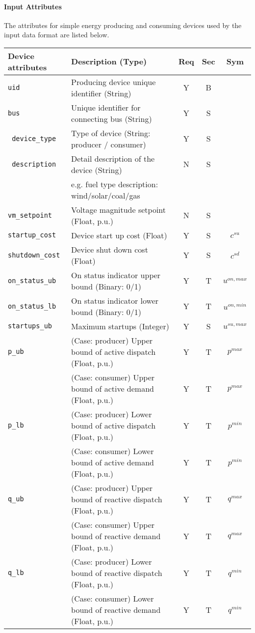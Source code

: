 \documentclass{article}
\begin{document}
\paragraph{Input Attributes} The attributes for 
simple energy producing and consuming devices used by the input data format are listed below.

\begin{center}
\small
\begin{tabular}{ l | l | c | c | c |}
Device attributes & Description (Type) & Req & Sec & Sym\\
\hline
  {\tt uid} & Producing device unique identifier (String) & Y & B &  \\
  {\tt bus} & Unique identifier for connecting bus (String)& Y & S & \\
  {\tt\color{red} device\_type} & Type of device (String: producer / consumer) & Y & S & \\
  {\tt\color{red} description} & Detail description of the device  (String) & N & S & \\
      &e.g. fuel type description: wind/solar/coal/gas  &  &  & \\
  {\tt vm\_setpoint} & Voltage magnitude setpoint (Float, p.u.) & N & S & \\
  {\tt startup\_cost} & Device start up cost (Float) & Y & S & $c^{su}$\\
  {\tt shutdown\_cost} & Device shut down cost (Float) & Y & S & $c^{sd}$\\  
  {\tt on\_status\_ub} & On status indicator upper bound (Binary: 0/1) & Y & T & $u^{on,max}$\\
  {\tt on\_status\_lb} & On status indicator lower bound (Binary: 0/1) & Y & T & $u^{on,min}$\\

  {\tt startups\_ub} & Maximum startups (Integer) & Y & S & $u^{su,max}$\\  
  {\tt p\_ub} & { (Case: producer) Upper bound of active dispatch (Float, p.u.)   }& Y & T & $p^{max}$ \\
              & { (Case: consumer) Upper bound of active demand   (Float, p.u.)   }& Y & T & $p^{max}$ \\
  {\tt p\_lb} & { (Case: producer) Lower bound of active dispatch (Float, p.u.)   }& Y & T & $p^{min}$ \\
              & { (Case: consumer) Lower bound of active demand   (Float, p.u.)   }& Y & T & $p^{min}$ \\
  {\tt q\_ub} & { (Case: producer) Upper bound of reactive dispatch (Float, p.u.) }& Y & T & $q^{max}$\\
              & { (Case: consumer) Upper bound of reactive demand   (Float, p.u.) }& Y & T & $q^{max}$\\
  {\tt q\_lb} & { (Case: producer) Lower bound of reactive dispatch (Float, p.u.) }& Y & T & $q^{min}$\\ 
              & { (Case: consumer) Lower bound of reactive demand   (Float, p.u.) }& Y & T & $q^{min}$\\ 


\end{tabular}
\end{center}
\end{document}
